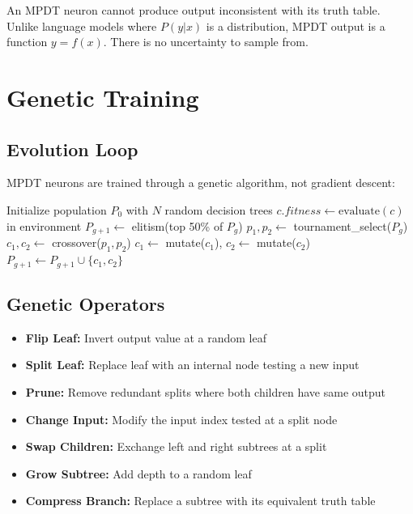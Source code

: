 \documentclass{article}
\begin{document}
\begin{theorem}[No Hallucinations]
An MPDT neuron cannot produce output inconsistent with its truth table. Unlike 
language models where $P(y|x)$ is a distribution, MPDT output is a function 
$y = f(x)$. There is no uncertainty to sample from.
\end{theorem}

\section{Genetic Training}

\subsection{Evolution Loop}

MPDT neurons are trained through a genetic algorithm, not gradient descent:

\begin{algorithm}
\caption{MPDT Evolution}
\begin{algorithmic}
\STATE Initialize population $P_0$ with $N$ random decision trees
        \STATE $c.fitness \gets \text{evaluate}(c)$ in environment
    \ENDFOR
    \STATE $P_{g+1} \gets$ elitism(top 50\% of $P_g$)
        \STATE $p_1, p_2 \gets$ tournament\_select($P_g$)
        \STATE $c_1, c_2 \gets$ crossover($p_1, p_2$)
        \STATE $c_1 \gets$ mutate($c_1$), $c_2 \gets$ mutate($c_2$)
        \STATE $P_{g+1} \gets P_{g+1} \cup \{c_1, c_2\}$
    \ENDWHILE
\ENDFOR
\end{algorithmic}
\end{algorithm}

\subsection{Genetic Operators}

\begin{itemize}
    \item \textbf{Flip Leaf:} Invert output value at a random leaf
    \item \textbf{Split Leaf:} Replace leaf with an internal node testing a new input
    \item \textbf{Prune:} Remove redundant splits where both children have same output
    \item \textbf{Change Input:} Modify the input index tested at a split node
    \item \textbf{Swap Children:} Exchange left and right subtrees at a split
    \item \textbf{Grow Subtree:} Add depth to a random leaf
    \item \textbf{Compress Branch:} Replace a subtree with its equivalent truth table
\end{itemize}
\end{document}
